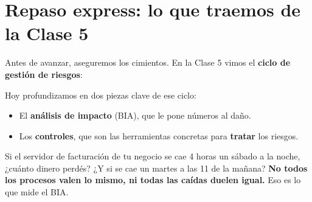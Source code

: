 \documentclass[12pt,a4paper]{article}
\begin{document}
\tableofcontents
\newpage

\section{Repaso express: lo que traemos de la Clase 5}

Antes de avanzar, aseguremos los cimientos. En la Clase 5 vimos el \textbf{ciclo de gesti\'on de riesgos}:

\begin{center}
\end{center}

Hoy profundizamos en dos piezas clave de ese ciclo:
\begin{itemize}[leftmargin=2em]
    \item El \textbf{an\'alisis de impacto} (BIA), que le pone n\'umeros al da\~no.
    \item Los \textbf{controles}, que son las herramientas concretas para \textbf{tratar} los riesgos.
\end{itemize}

\begin{cajaConcepto}[title={Pregunta disparadora}]
Si el servidor de facturaci\'on de tu negocio se cae 4 horas un s\'abado a la noche, ¿cu\'anto dinero perd\'es? ¿Y si se cae un martes a las 11 de la ma\~nana? \textbf{No todos los procesos valen lo mismo, ni todas las ca\'idas duelen igual.} Eso es lo que mide el BIA.
\end{cajaConcepto}
\end{document}
